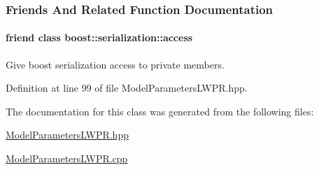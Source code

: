 \subsubsection{Friends And Related Function Documentation}
\hypertarget{classDmpBbo_1_1ModelParametersLWPR_ac98d07dd8f7b70e16ccb9a01abf56b9c}{
\paragraph[{boost\+::serialization\+::access}]{\setlength{\rightskip}{0pt plus 5cm}friend class boost\+::serialization\+::access\hspace{0.3cm}{\ttfamily [friend]}}}\label{classDmpBbo_1_1ModelParametersLWPR_ac98d07dd8f7b70e16ccb9a01abf56b9c}


Give boost serialization access to private members. 



Definition at line 99 of file Model\+Parameters\+L\+W\+P\+R.\+hpp.



The documentation for this class was generated from the following files\+:\begin{DoxyCompactItemize}
\item 
\hyperlink{ModelParametersLWPR_8hpp}{Model\+Parameters\+L\+W\+P\+R.\+hpp}\item 
\hyperlink{ModelParametersLWPR_8cpp}{Model\+Parameters\+L\+W\+P\+R.\+cpp}\end{DoxyCompactItemize}
